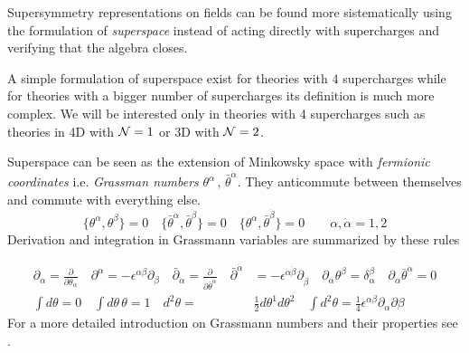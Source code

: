\begin{appendices}
Supersymmetry representations on fields can be found more sistematically using the formulation of \emph{superspace} instead of acting directly with supercharges and verifying that the algebra closes.

A simple formulation of superspace exist for theories with 4 supercharges while for theories with a bigger number of supercharges its definition is much more complex. 
We will be interested only in theories with 4 supercharges such as theories in 4D with $\mathcal{N}=1$ or 3D with $\mathcal{N}=2$.

Superspace can be seen as the extension of Minkowsky space with \emph{fermionic coordinates} i.e. \emph{Grassman numbers} $\theta^{\alpha} \, , \, \bar{\theta}^{\dot{\alpha}}$.
They anticommute between themselves and commute with everything else.
\begin{equation}
 \{ \theta^{\alpha} , \theta^{\beta} \} = 0 \quad  \{ \bar{\theta}^{\dot{\alpha}} , \bar{\theta}^{\dot{\beta}} \} = 0 \quad \{   \theta^{\alpha}  , \bar{\theta}^{\dot{\beta}}\} = 0 \qquad \alpha,\dot{\alpha} = 1,2
\end{equation}
Derivation and integration in Grassmann variables are summarized by these rules 

\begin{align}
 \partial_{\alpha} = \frac{\partial}{\partial \theta_{\alpha}} \quad 
 \partial^{\alpha} = -\epsilon^{\alpha \beta} \partial_{\beta} \quad
 \bar{\partial}_{\dot{\alpha}} =  \frac{\partial}{\partial \bar{\theta}^{\dot{\alpha}}} \quad 
 \bar{\partial}^{\dot{\alpha}} &= -\epsilon^{\dot{\alpha}  \dot{\beta}} \partial_{\dot{\beta}} 
\quad
 \partial_{\alpha} \theta^{\beta} = \delta^{\beta}_{\alpha} \quad
 \partial_{\alpha} \bar{\theta}^{\dot{\alpha}} = 0
 \\
 \int d \theta  = 0 \quad \int d \theta \, \theta = 1 \quad d^2\theta = & \frac{1}{2} d \theta^1 
  d \theta^2 \quad \int d^2 \theta = \frac{1}{4} \epsilon^{\alpha \beta } \partial_{\alpha} \partial{\beta}
\end{align}
For a more detailed introduction on Grassmann numbers and their properties see \cite{Bilal:2001nv}.


\end{appendices}

